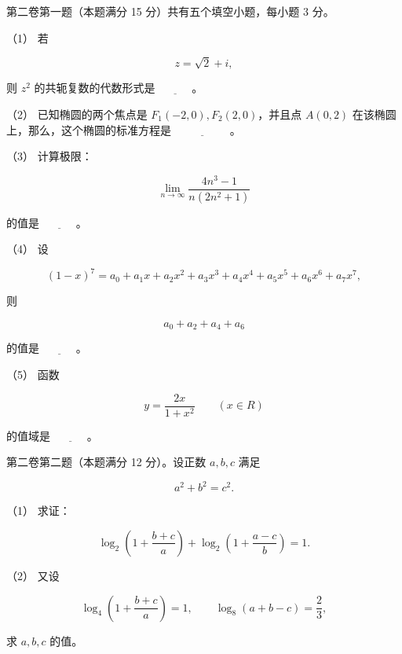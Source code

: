 \begin{question}

第二卷第一题（本题满分 15 分）共有五个填空小题，每小题 3 分。

（1） 若

\nopagebreak[4]
\[
z=\sqrt2+i,
\]

则 $z^2$ 的共轭复数的代数形式是 $\underline{\hspace{3em}}$。

（2） 已知椭圆的两个焦点是 $F_1(-2,0),F_2(2,0)$，并且点 $A(0,2)$ 在该椭圆上，那么，这个椭圆的标准方程是 $\underline{\hspace{5em}}$。

（3） 计算极限：

\nopagebreak[4]
\[
\lim_{n\to\infty}\frac{4n^3-1}{n(2n^2+1)}
\]

的值是 $\underline{\hspace{3em}}$。

（4） 设

\nopagebreak[4]
\[
(1-x)^7=a_0+a_1x+a_2x^2+a_3x^3+a_4x^4+a_5x^5+a_6x^6+a_7x^7,
\]

则

\nopagebreak[4]
\[
a_0+a_2+a_4+a_6
\]

的值是 $\underline{\hspace{3em}}$。

（5） 函数

\nopagebreak[4]
\[
y=\frac{2x}{1+x^2}\qquad(x\in R)
\]

的值域是 $\underline{\hspace{3em}}$。

\end{question}
\begin{question}

第二卷第二题（本题满分 12 分）。设正数 $a,b,c$ 满足

\nopagebreak[4]
\[
a^2+b^2=c^2.
\]

（1） 求证：

\nopagebreak[4]
\[
\log_2\left(1+\frac{b+c}{a}\right)
+\log_2\left(1+\frac{a-c}{b}\right)=1.
\]

（2） 又设

\nopagebreak[4]
\[
\log_4\left(1+\frac{b+c}{a}\right)=1,\qquad
\log_8(a+b-c)=\frac23,
\]

求 $a,b,c$ 的值。

\Needspace{0.4\textheight}
\end{question}
